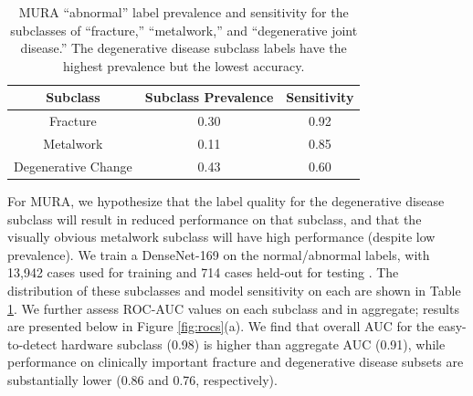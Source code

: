 \documentclass{article}
\begin{document}
\begin{table}[]
\centering
\begin{tabular}{|c|c|c|}
 \hline
 Subclass & Subclass Prevalence & Sensitivity \\
 \hline
 Fracture & 0.30 & 0.92   \\
 Metalwork & 0.11 & 0.85    \\
 Degenerative Change & 0.43 & 0.60 \\
 \hline
\end{tabular}
\caption{MURA ``abnormal'' label prevalence and sensitivity for the subclasses of ``fracture,'' ``metalwork,'' and ``degenerative joint disease.'' The degenerative disease subclass labels have the highest prevalence but the lowest accuracy.}
\label{tab:mura2}
\vspace{-6mm}
\end{table}

For MURA, we hypothesize that the label quality for the degenerative disease subclass will result in reduced performance on that subclass, and that the visually obvious metalwork subclass will have high performance (despite low prevalence).
 We train a DenseNet-169 on the normal/abnormal labels, with 13,942 cases used for training and 714 cases held-out for testing \citep{Rajpurkar2017-rc}.  
 The distribution of these subclasses and model sensitivity on each are shown in Table \ref{tab:mura2}.
 We further assess ROC-AUC values on each subclass and in aggregate; results are presented below in Figure \ref{fig:rocs}(a).  
 We find that overall AUC for the easy-to-detect hardware subclass (0.98) is higher than aggregate AUC (0.91), while performance on clinically important fracture and degenerative  disease subsets are substantially lower (0.86 and 0.76, respectively).  
\end{document}
